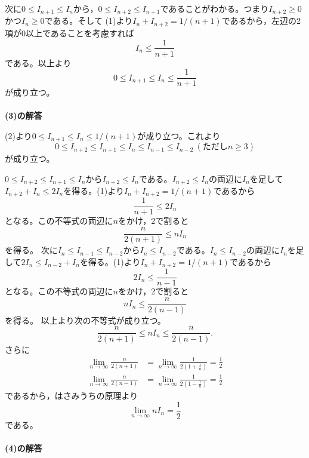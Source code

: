 \documentclass[../main]{subfiles}
\begin{document}
次に$0\leq I_{n+1}\leq I_{n}$から，$0\leq I_{n+2}\leq I_{n+1}$であることがわかる。つまり$I_{n+2}\geq 0$かつ$I_{n}\geq 0$である。そして (1)より$I_{n}+I_{n+2}=1/(n+1)$であるから，左辺の2項が0以上であることを考慮すれば
\[I_{n} \leq \frac{1}{n+1}\]
である。以上より
\[0 \leq I_{n+1} \leq I_{n} \leq \frac{1}{n+1}\]
が成り立つ。
\\
\\
{\bf (3)の解答}

(2)より$0 \leq I_{n+1} \leq I_{n} \leq 1/(n+1)$が成り立つ。これより
\[0 \leq I_{n+2} \leq I_{n+1} \leq I_{n} \leq I_{n-1} \leq I_{n-2} \ (ただしn\geq 3)\]
が成り立つ。

$0 \leq I_{n+2} \leq I_{n+1} \leq I_{n}$から$I_{n+2}\leq I_{n}$である。$I_{n+2}\leq I_{n}$の両辺に$I_{n}$を足して$I_{n+2}+I_{n}\leq 2I_{n}$を得る。(1)より$I_{n}+I_{n+2}=1/(n+1)$であるから
\[\frac{1}{n+1} \leq 2 I_{n}\]
となる。この不等式の両辺に$n$をかけ，2で割ると
\[\frac{n}{2(n+1)} \leq n I_{n}\]
を得る。
次に$I_{n} \leq I_{n-1} \leq I_{n-2}$から$I_{n}\leq I_{n-2}$である。$I_{n}\leq I_{n-2}$の両辺に$I_{n}$を足して$2I_{n}\leq I_{n-2}+I_{n}$を得る。(1)より$I_{n}+I_{n+2}=1/(n+1)$であるから
\[2 I_{n} \leq \frac{1}{n-1}\]
となる。この不等式の両辺に$n$をかけ，2で割ると
\[n I_{n} \leq \frac{n}{2(n-1)}\]
を得る。
以上より次の不等式が成り立つ。
\[\frac{n}{2(n+1)} \leq n I_{n} \leq \frac{n}{2(n-1)}.\]
さらに
\[\begin{aligned}
  \lim _{n \rightarrow \infty} \frac{n}{2(n+1)} &=\lim _{n \rightarrow \infty} \frac{1}{2\left(1+\frac{1}{n}\right)}=\frac{1}{2} \\
  \lim _{n \rightarrow \infty} \frac{n}{2(n-1)} &=\lim _{n \rightarrow \infty} \frac{1}{2\left(1-\frac{1}{n}\right)}=\frac{1}{2}
\end{aligned}\]
であるから，はさみうちの原理より
\[\lim _{n \rightarrow \infty} n I_{n}=\frac{1}{2}\]
である。
\\
\\
{\bf (4)の解答}
\end{document}
